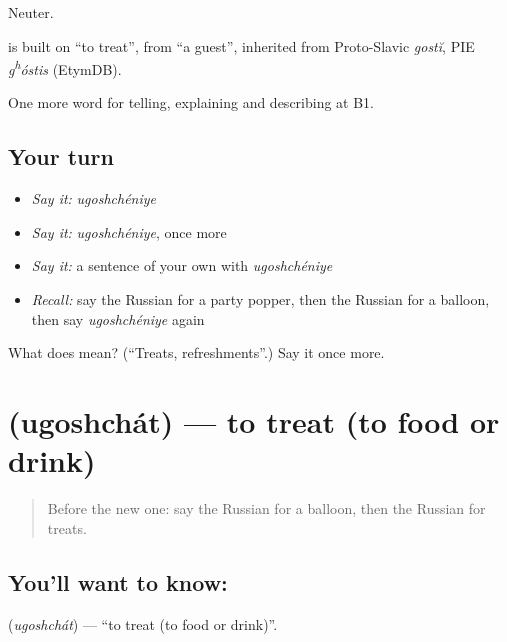 Neuter.

\begin{cousinweb}
\emph{} is built on \emph{} \textquotedblleft{}to treat\textquotedblright{}, from \emph{} \textquotedblleft{}a guest\textquotedblright{}, inherited from Proto-Slavic \emph{gostĭ}, PIE \emph{g\textsuperscript{h}óstis} (EtymDB).
\end{cousinweb}

\begin{grammarlens}[title={What you've built}]
One more word for telling, explaining and describing at B1.
\end{grammarlens}

\subsection*{Your turn}
\begin{itemize}
\raggedright
  \item \emph{Say it:} \emph{ugoshchéniye}
  \item \emph{Say it:} \emph{ugoshchéniye}, once more
  \item \emph{Say it:} a sentence of your own with \emph{ugoshchéniye}
  \item \emph{Recall:} say the Russian for a party popper, then the Russian for a balloon, then say \emph{ugoshchéniye} again
\end{itemize}

\begin{tcolorbox}[breakable,colback=teal!4,colframe=teal!35!black,title={Before you move on}]
What does  mean? (\textquotedblleft{}Treats, refreshments\textquotedblright{}.) Say it once more.
\end{tcolorbox}
\section[\texorpdfstring{\ru{угощать} (ugoshchát)}{угощать (ugoshchát)}]{ (ugoshchát) — to treat (to food or drink)}

\label{lesson:RU-C315-ugoshchat}



\begin{quote}
Before the new one: say the Russian for a balloon, then the Russian for treats.
\end{quote}

\subsection*{You'll want to know: }
\textbf{} (\emph{ugoshchát}) — \textquotedblleft{}to treat (to food or drink)\textquotedblright{}.

